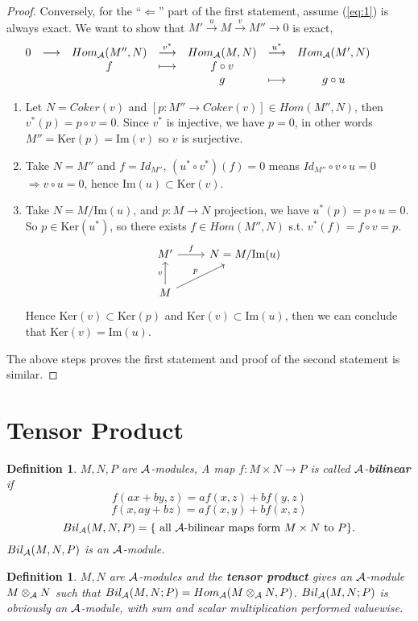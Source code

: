 \documentclass[11pt]{article}
\newtheorem{dfn}[thm]{Definition}
\newcommand{\cala}{{\cal A}}
\newcommand{\Lrta}{\Longrightarrow}
\newcommand{\lrta}{\longrightarrow}
\newcommand{\Llta}{\Longleftarrow}
\begin{document}
\begin{proof}
 Conversely, for the ``$\Llta$'' part of the first statement, assume (\ref{eq:1}) is always exact. We want to show that $M'\overset{u}{\lrta}M\overset{v}{\lrta}M'' \lrta0$ is exact, 
 $$
\begin{array}{ c c c c c c c c c}
0 & \longrightarrow  & Hom_\cala(M'',N) & \overset{v^*}{\longrightarrow } & Hom_\cala(M,N) & \overset{u^*}{\longrightarrow } & Hom_\cala(M',N) &  & \\
 &  & f &\longmapsto  & f\circ v &  &  &  & \\
 &  &  &  & g & \longmapsto & g\circ u &  &
\end{array}
 $$
 \begin{enumerate}
\item Let $N=Coker(v)$ and $[p:M''\lrta Coker(v)]\in Hom(M'',N)$, then $v^*(p)=p\circ v=0$. Since $v^*$ is injective, we have $p=0$, in other words $M''=\text{Ker}(p)=\text{Im}(v)$ so $v$ is surjective.
\item Take $N=M''$ and $f=Id_{M''}$, $(u^*\circ v^*)(f)=0$ means $Id_{M''}\circ v\circ u=0$ $\Lrta v\circ u=0$, hence $\text{Im}(u)\subset \text{Ker}(v)$.
\item  Take $N=M/\text{Im}(u)$, and $p:M\lrta N$ projection, we have $u^*(p)=p\circ u=0$. So $p\in \text{Ker}(u^*)$, so there exists $f\in Hom(M'',N) $ s.t. $v^*(f)=f\circ v=p$. 
\[
\begin{tikzcd}
 M'  \arrow[r,"f"] & N=M/\text{Im}(u) \\
M\arrow[ur,"p"] \arrow[u,"v"] &    
\end{tikzcd}
\]
Hence $\text{Ker}(v)\subset \text{Ker}(p)$ and $\text{Ker}(v)\subset \text{Im}(u)$, then we can conclude that $\text{Ker}(v)=\text{Im}(u)$.
\end{enumerate}
The above steps proves the first statement and proof of the second statement is similar.
\end{proof}
\section*{Tensor Product}
\begin{dfn}
$M,N,P$  are $\cala$-modules, A map $f:M\times N\lrta P$ is called $\cala$-\textbf{bilinear} if 
$$
f(ax+by, z)=af(x,z)+bf(y,z)
$$
$$
f(x,ay+bz)=a f(x,y)+bf(x,z)
$$
$$
Bil_{\cala}(M,N,P)=\{\text{ all $\cala$-bilinear maps form $M\times N$ to $P$}\}.
$$
$Bil_{\cala}(M,N,P)$ is an $\cala$-module.
\end{dfn}

\begin{dfn}\label{def:tensor_product}
$M,N$ are $\cala$-modules and the \textbf{tensor product} gives an $\cala$-module $M\otimes_\cala N$ such that $Bil_\cala(M,N;P)=Hom_{\cala}(M\otimes_\cala N,P)$. $Bil_\cala(M,N;P)$ is obviously an $\cala$-module, with sum and scalar multiplication performed valuewise.
\end{dfn}
\end{document}
